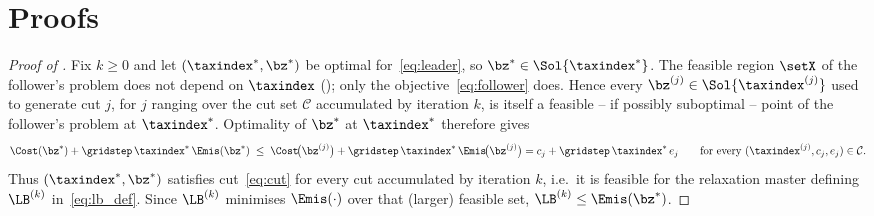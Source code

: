 
\section{Proofs}
\label{app:proofs}

\begin{proof}[Proof of ]
Fix $k\ge0$ and let $(\taxindex^{*},\bz^{*})$ be optimal
for~\eqref{eq:leader}, so $\bz^{*}\in\Sol{\taxindex^{*}}$. The feasible
region $\setX$ of the follower's problem does not depend on $\taxindex$
(); only the objective~\eqref{eq:follower}
does. Hence every $\bz^{(j)}\in\Sol{\taxindex^{(j)}}$ used to generate
cut $j$, for $j$ ranging over the cut set $\mathcal{C}$ accumulated by
iteration $k$, is itself a feasible -- if possibly suboptimal -- point
of the follower's problem at $\taxindex^{*}$. Optimality of $\bz^{*}$ at
$\taxindex^{*}$ therefore gives
\begin{equation*}
\Cost(\bz^{*})+\gridstep\,\taxindex^{*}\,\Emis(\bz^{*})
\;\le\;
\Cost\!\bigl(\bz^{(j)}\bigr)+\gridstep\,\taxindex^{*}\,\Emis\!\bigl(\bz^{(j)}\bigr)
= c_{j}+\gridstep\,\taxindex^{*}\,e_{j}
\qquad\text{for every }(\taxindex^{(j)},c_{j},e_{j})\in\mathcal{C}.
\end{equation*}
Thus $(\taxindex^{*},\bz^{*})$ satisfies cut~\eqref{eq:cut} for every
cut accumulated by iteration $k$, i.e.\ it is feasible for the
relaxation master defining $\LB^{(k)}$ in~\eqref{eq:lb_def}. Since
$\LB^{(k)}$ minimises $\Emis(\cdot)$ over that (larger) feasible set,
$\LB^{(k)}\le\Emis(\bz^{*})$.
\end{proof}

